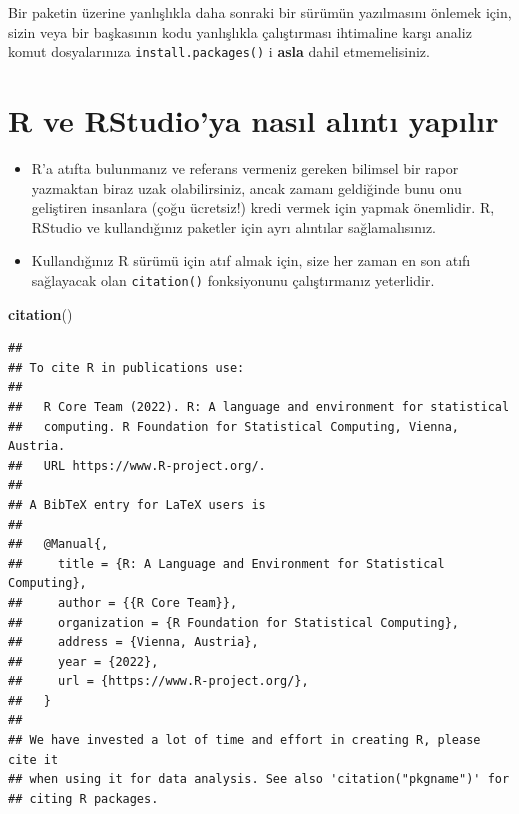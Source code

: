 \documentclass[
  oneside]{book}
\newenvironment{Shaded}{\begin{snugshade}}{\end{snugshade}}
\newcommand{\FunctionTok}[1]{\textcolor[rgb]{0.13,0.29,0.53}{\textbf{#1}}}
\newcommand{\NormalTok}[1]{#1}
\begin{document}
\begin{info}
Bir paketin üzerine yanlışlıkla daha sonraki bir sürümün yazılmasını
önlemek için, sizin veya bir başkasının kodu yanlışlıkla çalıştırması
ihtimaline karşı analiz komut dosyalarınıza \texttt{install.packages()}
i \textbf{asla} dahil etmemelisiniz.
\end{info}

\hypertarget{r-ve-rstudioya-nasux131l-alux131ntux131-yapux131lux131r}{%
\section{R ve RStudio'ya nasıl alıntı yapılır}\label{r-ve-rstudioya-nasux131l-alux131ntux131-yapux131lux131r}}

\begin{itemize}
\item
  R'a atıfta bulunmanız ve referans vermeniz gereken bilimsel bir rapor yazmaktan biraz uzak olabilirsiniz, ancak zamanı geldiğinde bunu onu geliştiren insanlara (çoğu ücretsiz!) kredi vermek için yapmak önemlidir. R, RStudio ve kullandığınız paketler için ayrı alıntılar sağlamalısınız.
\item
  Kullandığınız R sürümü için atıf almak için, size her zaman en son atıfı sağlayacak olan \texttt{citation()} fonksiyonunu çalıştırmanız yeterlidir.
\end{itemize}

\begin{Shaded}
\begin{Highlighting}[]
\FunctionTok{citation}\NormalTok{()}
\end{Highlighting}
\end{Shaded}

\begin{verbatim}
## 
## To cite R in publications use:
## 
##   R Core Team (2022). R: A language and environment for statistical
##   computing. R Foundation for Statistical Computing, Vienna, Austria.
##   URL https://www.R-project.org/.
## 
## A BibTeX entry for LaTeX users is
## 
##   @Manual{,
##     title = {R: A Language and Environment for Statistical Computing},
##     author = {{R Core Team}},
##     organization = {R Foundation for Statistical Computing},
##     address = {Vienna, Austria},
##     year = {2022},
##     url = {https://www.R-project.org/},
##   }
## 
## We have invested a lot of time and effort in creating R, please cite it
## when using it for data analysis. See also 'citation("pkgname")' for
## citing R packages.
\end{verbatim}
\end{document}
